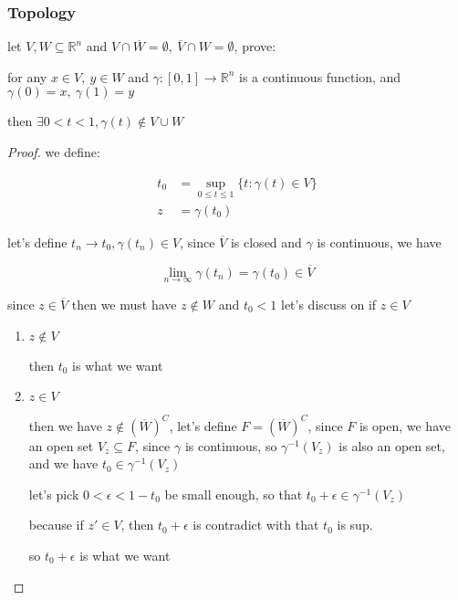 \subsubsection{Topology}

\begin{exercise}
    let $V, W \subseteq \mathbb{R}^n$ and $V \cap \overline{W} = \emptyset,\: \overline{V} \cap W = \emptyset$, prove:

    for any $x \in V,\: y \in W$ and $\gamma: [0,1] \to \mathbb{R}^n$ is a continuous function, and  $\gamma(0) = x,\: \gamma(1) = y$

    then $\exists 0 < t < 1, \gamma(t) \notin V \cup W$

\end{exercise}

\begin{proof}
    we define: 
    
    \begin{align*}
        t_0 &= \sup_{0 \le t \le 1} \{ t: \gamma(t) \in V \} \\
           z &= \gamma(t_0)
    \end{align*}

    let's define $t_n \to t_0, \gamma(t_n) \in V$, since $\overline{V}$ is closed and $\gamma$ is continuous, we have

    \[
        \lim_{n \to \infty}\gamma(t_n) = \gamma(t_0) \in \overline{V}
    \]

    since $z \in \overline{V}$ then we must have $z \notin W$ and $t_0 < 1$ let's discuss on if $z \in V$

    \begin{enumerate}
        \item $z \notin V$

        then $t_0$ is what we want

        \item $z \in V$

        then we have $z \notin (\overline{W})^C$, let's define $F = (\overline{W})^C$, since $F$ is open, we have an open set $V_z \subseteq F$,
        since $\gamma$ is continuous, so $\gamma^{-1}(V_z)$ is also an open set, and we have $t_0 \in \gamma^{-1}(V_z)$

        let's pick $0 < \epsilon < 1 - t_0$ be small enough, so that $t_0 + \epsilon \in \gamma^{-1}(V_z)$

        because if $z' \in V$, then $t_0 + \epsilon$ is contradict with that $t_0$ is sup.

        so $t_0 + \epsilon$ is what we want
    \end{enumerate}
\end{proof}


